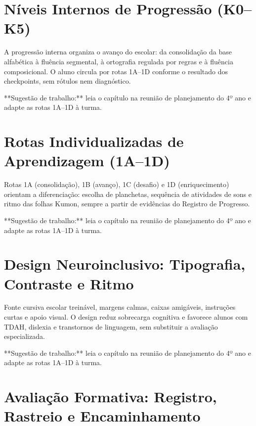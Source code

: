 \chapter{Níveis Internos de Progressão (K0–K5)}

A progressão interna organiza o avanço do escolar: da consolidação da base alfabética à fluência segmental, à ortografia regulada por regras e à fluência composicional. O aluno circula por rotas 1A–1D conforme o resultado dos checkpoints, sem rótulos nem diagnóstico.


\begin{dica}
**Sugestão de trabalho:** leia o capítulo na reunião de planejamento do 4º ano e adapte as rotas 1A–1D à turma.
\end{dica}

\chapter{Rotas Individualizadas de Aprendizagem (1A–1D)}

Rotas 1A (consolidação), 1B (avanço), 1C (desafio) e 1D (enriquecimento) orientam a diferenciação: escolha de planchetas, sequência de atividades de sons e ritmo das folhas Kumon, sempre a partir de evidências do Registro de Progresso.


\begin{dica}
**Sugestão de trabalho:** leia o capítulo na reunião de planejamento do 4º ano e adapte as rotas 1A–1D à turma.
\end{dica}

\chapter{Design Neuroinclusivo: Tipografia, Contraste e Ritmo}

Fonte cursiva escolar treinável, margens calmas, caixas amigáveis, instruções curtas e apoio visual. O design reduz sobrecarga cognitiva e favorece alunos com TDAH, dislexia e transtornos de linguagem, sem substituir a avaliação especializada.


\begin{dica}
**Sugestão de trabalho:** leia o capítulo na reunião de planejamento do 4º ano e adapte as rotas 1A–1D à turma.
\end{dica}

\chapter{Avaliação Formativa: Registro, Rastreio e Encaminhamento}

